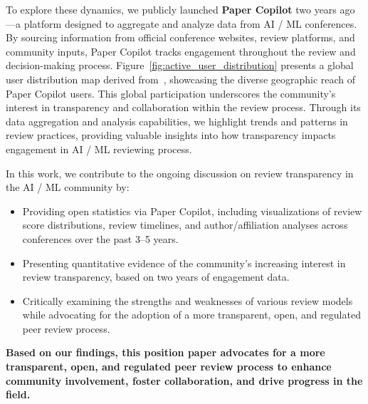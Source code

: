 To explore these dynamics, we publicly launched \textbf{Paper Copilot} two years ago—a platform designed to aggregate and analyze data from AI / ML conferences. By sourcing information from official conference websites, review platforms, and community inputs, Paper Copilot tracks engagement throughout the review and decision-making process. Figure~\ref{fig:active_user_distribution} presents a global user distribution map derived from~\citet{googleanalytics}, showcasing the diverse geographic reach of Paper Copilot users. This global participation underscores the community’s interest in transparency and collaboration within the review process. Through its data aggregation and analysis capabilities, we highlight trends and patterns in review practices, providing valuable insights into how transparency impacts engagement in AI / ML reviewing process.

In this work, we contribute to the ongoing discussion on review transparency in the AI / ML community by: \begin{itemize} \item Providing open statistics via Paper Copilot, including visualizations of review score distributions, review timelines, and author/affiliation analyses across conferences over the past 3–5 years. \item Presenting quantitative evidence of the community's increasing interest in review transparency, based on two years of engagement data. \item Critically examining the strengths and weaknesses of various review models while advocating for the adoption of a more transparent, open, and regulated peer review process. \end{itemize}

\textbf{Based on our findings, this position paper advocates for a more transparent, open, and regulated peer review process to enhance community involvement, foster collaboration, and drive progress in the field.}

% 

